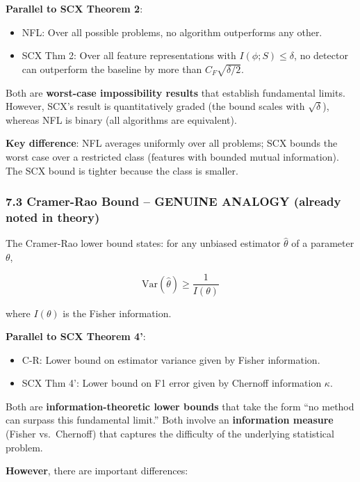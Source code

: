 \documentclass[
  12pt,
]{article}
\providecommand{\tightlist}{%
  \setlength{\itemsep}{0pt}\setlength{\parskip}{0pt}}
\begin{document}
\textbf{Parallel to SCX Theorem 2}:

\begin{itemize}
\tightlist
\item
  NFL: Over all possible problems, no algorithm outperforms any other.
\item
  SCX Thm 2: Over all feature representations with
  \(I(\phi; S) \leq \delta\), no detector can outperform the baseline by
  more than \(C_F\sqrt{\delta/2}\).
\end{itemize}

Both are \textbf{worst-case impossibility results} that establish
fundamental limits. However, SCX's result is quantitatively graded (the
bound scales with \(\sqrt{\delta}\)), whereas NFL is binary (all
algorithms are equivalent).

\textbf{Key difference}: NFL averages uniformly over all problems; SCX
bounds the worst case over a restricted class (features with bounded
mutual information). The SCX bound is tighter because the class is
smaller.

\subsubsection{7.3 Cramer-Rao Bound -- GENUINE ANALOGY (already noted in
theory)}\label{cramer-rao-bound-genuine-analogy-already-noted-in-theory}

The Cramer-Rao lower bound states: for any unbiased estimator
\(\hat{\theta}\) of a parameter \(\theta\),

\[\text{Var}(\hat{\theta}) \geq \frac{1}{I(\theta)}\]

where \(I(\theta)\) is the Fisher information.

\textbf{Parallel to SCX Theorem 4'}:

\begin{itemize}
\tightlist
\item
  C-R: Lower bound on estimator variance given by Fisher information.
\item
  SCX Thm 4': Lower bound on F1 error given by Chernoff information
  \(\kappa\).
\end{itemize}

Both are \textbf{information-theoretic lower bounds} that take the form
``no method can surpass this fundamental limit.'' Both involve an
\textbf{information measure} (Fisher vs.~Chernoff) that captures the
difficulty of the underlying statistical problem.

\textbf{However}, there are important differences:
\end{document}
